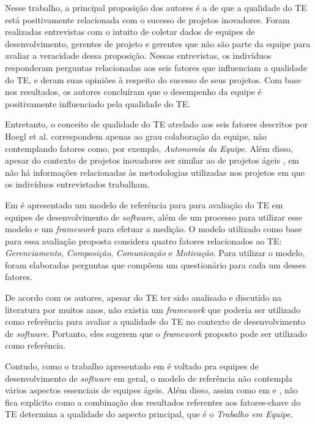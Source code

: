 Nesse trabalho, a principal proposição dos autores é a de que a qualidade do TE está positivamente relacionada com o sucesso de projetos inovadores. Foram realizadas entrevistas com o intuito de coletar dados de equipes de desenvolvimento, gerentes de projeto e gerentes que não são parte da equipe para avaliar a veracidade dessa proposição. Nessas entrevistas, os indivíduos responderam perguntas relacionadas aos seis fatores que influenciam a qualidade do TE, e deram suas opiniões à respeito do sucesso de seus projetos. Com base nos resultados, os autores concluíram que o desempenho da equipe é positivamente influenciado pela qualidade do TE.

Entretanto, o conceito de qualidade do TE atrelado aos seis fatores descritos por Hoegl et al. \cite{hoegl} correspondem apenas ao grau colaboração da equipe, não contemplando fatores como, por exemplo, \textit{Autonomia da Equipe}. Além disso, apesar do contexto de projetos inovadores ser similar ao de projetos ágeis \cite{freire}, em \cite{hoegl} não há informações relacionadas às metodologias utilizadas nos projetos em que os indivíduos entrevistados trabalham.

Em \cite{amengual} é apresentado um modelo de referência para para avaliação do TE em equipes de desenvolvimento de \textit{software}, além de um processo para utilizar esse modelo e um \textit{framework} para efetuar a medição. O modelo utilizado como base para essa avaliação proposta considera quatro fatores relacionados ao TE: \textit{Gerenciamento}, \textit{Composição}, \textit{Comunicação} e \textit{Motivação}. Para utilizar o modelo, foram elaboradas perguntas que compõem um questionário para cada um desses fatores.

De acordo com os autores, apesar do TE ter sido analisado e discutido na literatura por muitos anos, não existia um \textit{framework} que poderia ser utilizado como referência para avaliar a qualidade do TE no contexto de desenvolvimento de \textit{software}. Portanto, eles sugerem que o \textit{framework} proposto pode ser utilizado como referência.

Contudo, como o trabalho apresentado em \cite{amengual} é voltado pra equipes de desenvolvimento de \textit{software} em geral, o modelo de referência não contempla vários aspectos essenciais de equipes ágeis. Além disso, assim como em \cite{moe} e \cite{hoegl}, não fica explícito como a combinação dos resultados referentes aos fatores-chave do TE determina a qualidade do aspecto principal, que é o \textit{Trabalho em Equipe}.

